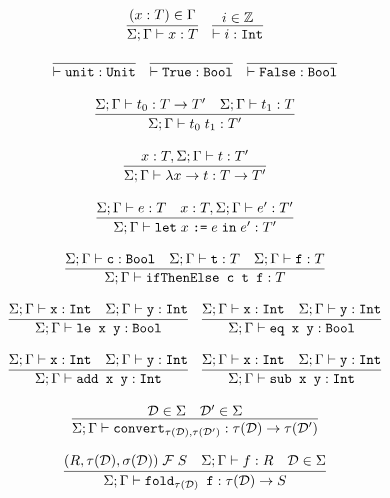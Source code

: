 \documentclass[10pt]{article}
\begin{document}
\[
  \begin{array}{c}
    \infer{\Sigma ; \Gamma \vdash x : T}{(x : T) \in \Gamma}
    ~~~
    \infer{\vdash i : \ttt{Int}}{i \in \mathbb{Z}}
    \\\\
    \infer{\vdash \ttt{unit} : \ttt{Unit}}{}
    ~~~
    \infer{\vdash \ttt{True} : \ttt{Bool}}{}
    ~~~
    \infer{\vdash \ttt{False} : \ttt{Bool}}{}
    \\\\
    \infer{\Sigma ; \Gamma \vdash t_0\; t_1 : T'}{\Sigma ; \Gamma \vdash t_0 : T \ra T' & \Sigma ; \Gamma \vdash t_1 : T}
    \\\\
    \infer{\Sigma ; \Gamma \vdash \lambda x \ra t : T \ra T'}{x : T, \Sigma ; \Gamma \vdash t : T'}
    \\\\
    \infer{\Sigma ; \Gamma \vdash \letbnd\; x\; \ttt{:=}\; e\; \inexpr\; e' : T'}{\Sigma ; \Gamma \vdash e : T & x : T, \Sigma ; \Gamma \vdash e' : T'}
    \\\\
    \infer{\Sigma ; \Gamma \vdash \ttt{ifThenElse c t f} : T}{\Sigma ; \Gamma \vdash \ttt{c} : \Bool & \Sigma ; \Gamma \vdash \ttt{t} : T & \Sigma ; \Gamma \vdash \ttt{f} : T}
    \\\\
    \infer{\Sigma ; \Gamma \vdash \ttt{le x y} : \Bool}{\Sigma ; \Gamma \vdash \ttt{x} : \Int & \Sigma ; \Gamma \vdash \ttt{y} : \Int}
    ~~~
    \infer{\Sigma ; \Gamma \vdash \ttt{eq x y} : \Bool}{\Sigma ; \Gamma \vdash \ttt{x} : \Int & \Sigma ; \Gamma \vdash \ttt{y} : \Int}
    \\\\
    \infer{\Sigma ; \Gamma \vdash \ttt{add x y} : \Int}{\Sigma ; \Gamma \vdash \ttt{x} : \Int & \Sigma ; \Gamma \vdash \ttt{y} : \Int}
    ~~~
    \infer{\Sigma ; \Gamma \vdash \ttt{sub x y} : \Int}{\Sigma ; \Gamma \vdash \ttt{x} : \Int & \Sigma ; \Gamma \vdash \ttt{y} : \Int}
    \\\\
    \infer{\Sigma ; \Gamma \vdash \ttt{convert}_{\tau(\mathcal{D}),\tau({\mathcal{D}'})} : \tau(\mathcal{D}) \ra \tau(\mathcal{D}')}{\mathcal{D} \in \Sigma & \mathcal{D}' \in \Sigma}
    \\\\
    \infer{\Sigma ; \Gamma \vdash \ttt{fold}_{\tau(\mathcal{D})} \ttt{ f} : \tau(\mathcal{D}) \ra S}{(R,\tau(\mathcal{D}),\sigma(\mathcal{D}))\; \mathcal{F}\; S & \Sigma ; \Gamma \vdash f : R & \mathcal{D} \in \Sigma}
  \end{array}
\]
\end{document}
